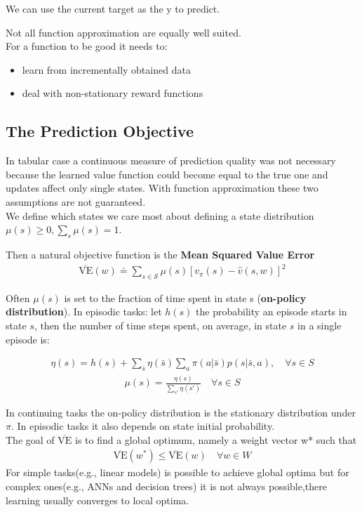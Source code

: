 We can use the current target as the y to predict.

Not all function approximation are equally well suited.\\

For a function to be good it needs to:
\begin{itemize}
    \item learn from incrementally obtained data
    \item deal with non-stationary reward functions
\end{itemize}
\subsection{The Prediction Objective}
In tabular case a continuous measure of prediction quality was not necessary because the learned value function could become equal to the true one and updates affect only single states.
With function approximation these two assumptions are not guaranteed.\\

We define which states we care most about defining a state distribution $\mu(s)\ge0,\sum_s\mu(s)=1$.

Then a natural objective function is the \textbf{Mean Squared Value Error}
\begin{align}
    \overline{\mbox{VE}}(w)\doteq\sum_{s\in\mathcal{S}}\mu(s)[v_\pi(s)-\hat{v}(s, w)]^2
\end{align}

Often $\mu(s)$ is set to the fraction of time spent in state s (\textbf{on-policy
distribution}).
In episodic tasks: let $h(s)$ the probability an episode starts in state $s$,
then the number of time steps spent, on average, in state $s$ in a
single episode is:

\begin{align}
    \eta(s)=h(s)+\sum_{\bar{s}}\eta(\bar{s})\sum_a\pi(a | \bar{s})p(s | \bar{s},a),\quad\forall s\in S
\end{align}
\begin{align}
    \mu(s)=\frac{\eta(s)}{\sum_{s'}\eta(s')}\quad\forall s\in S
\end{align}

In continuing tasks the on-policy distribution is the stationary
distribution under $\pi$. In episodic tasks it also depends on state initial
probability.\\


The goal of $\overline{\mbox{VE}}$ is to find a global optimum, namely a weight vector w* such that
\begin{align}
    \overline{\mbox{VE}}(w^*)\leq \overline{\mbox{VE}}(w)\quad \forall w\in W
\end{align}
For simple tasks(e.g., linear
models) is possible to achieve global optima but for complex ones(e.g., ANNs and decision trees) it is not always possible,there learning usually converges to local optima.

